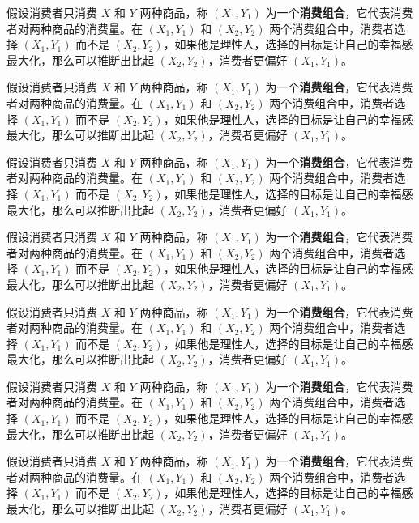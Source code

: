 \documentclass[../Main.tex]{subfiles}
\begin{document}
假设消费者只消费 $X$ 和 $Y$ 两种商品，称 $\left(X_1,Y_1\right)$ 为一个\textbf{消费组合}，它代表消费者对两种商品的消费量。在 $\left(X_1,Y_1\right)$ 和 $\left(X_2,Y_2\right)$ 两个消费组合中，消费者选择 $\left(X_1,Y_1\right)$ 而不是 $\left(X_2,Y_2\right)$，如果他是理性人，选择的目标是让自己的幸福感最大化，那么可以推断出比起 $\left(X_2,Y_2\right)$，消费者更偏好 $\left(X_1,Y_1\right)$。

假设消费者只消费 $X$ 和 $Y$ 两种商品，称 $\left(X_1,Y_1\right)$ 为一个\textbf{消费组合}，它代表消费者对两种商品的消费量。在 $\left(X_1,Y_1\right)$ 和 $\left(X_2,Y_2\right)$ 两个消费组合中，消费者选择 $\left(X_1,Y_1\right)$ 而不是 $\left(X_2,Y_2\right)$，如果他是理性人，选择的目标是让自己的幸福感最大化，那么可以推断出比起 $\left(X_2,Y_2\right)$，消费者更偏好 $\left(X_1,Y_1\right)$。

假设消费者只消费 $X$ 和 $Y$ 两种商品，称 $\left(X_1,Y_1\right)$ 为一个\textbf{消费组合}，它代表消费者对两种商品的消费量。在 $\left(X_1,Y_1\right)$ 和 $\left(X_2,Y_2\right)$ 两个消费组合中，消费者选择 $\left(X_1,Y_1\right)$ 而不是 $\left(X_2,Y_2\right)$，如果他是理性人，选择的目标是让自己的幸福感最大化，那么可以推断出比起 $\left(X_2,Y_2\right)$，消费者更偏好 $\left(X_1,Y_1\right)$。

假设消费者只消费 $X$ 和 $Y$ 两种商品，称 $\left(X_1,Y_1\right)$ 为一个\textbf{消费组合}，它代表消费者对两种商品的消费量。在 $\left(X_1,Y_1\right)$ 和 $\left(X_2,Y_2\right)$ 两个消费组合中，消费者选择 $\left(X_1,Y_1\right)$ 而不是 $\left(X_2,Y_2\right)$，如果他是理性人，选择的目标是让自己的幸福感最大化，那么可以推断出比起 $\left(X_2,Y_2\right)$，消费者更偏好 $\left(X_1,Y_1\right)$。

假设消费者只消费 $X$ 和 $Y$ 两种商品，称 $\left(X_1,Y_1\right)$ 为一个\textbf{消费组合}，它代表消费者对两种商品的消费量。在 $\left(X_1,Y_1\right)$ 和 $\left(X_2,Y_2\right)$ 两个消费组合中，消费者选择 $\left(X_1,Y_1\right)$ 而不是 $\left(X_2,Y_2\right)$，如果他是理性人，选择的目标是让自己的幸福感最大化，那么可以推断出比起 $\left(X_2,Y_2\right)$，消费者更偏好 $\left(X_1,Y_1\right)$。

假设消费者只消费 $X$ 和 $Y$ 两种商品，称 $\left(X_1,Y_1\right)$ 为一个\textbf{消费组合}，它代表消费者对两种商品的消费量。在 $\left(X_1,Y_1\right)$ 和 $\left(X_2,Y_2\right)$ 两个消费组合中，消费者选择 $\left(X_1,Y_1\right)$ 而不是 $\left(X_2,Y_2\right)$，如果他是理性人，选择的目标是让自己的幸福感最大化，那么可以推断出比起 $\left(X_2,Y_2\right)$，消费者更偏好 $\left(X_1,Y_1\right)$。

假设消费者只消费 $X$ 和 $Y$ 两种商品，称 $\left(X_1,Y_1\right)$ 为一个\textbf{消费组合}，它代表消费者对两种商品的消费量。在 $\left(X_1,Y_1\right)$ 和 $\left(X_2,Y_2\right)$ 两个消费组合中，消费者选择 $\left(X_1,Y_1\right)$ 而不是 $\left(X_2,Y_2\right)$，如果他是理性人，选择的目标是让自己的幸福感最大化，那么可以推断出比起 $\left(X_2,Y_2\right)$，消费者更偏好 $\left(X_1,Y_1\right)$。
\end{document}
